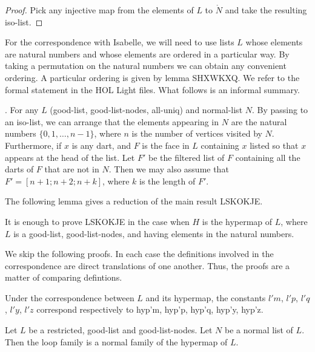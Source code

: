 \begin{proof} Pick any injective map from the elements of $L$ to $\ring{N}$ and take the resulting iso-list.
\end{proof}

For the correspondence with Isabelle, we will need to use lists $L$ whose elements are natural numbers and
whose elements are ordered in a particular way.  By taking a permutation on the natural numbers we can obtain
any convenient ordering.  A particular ordering is given by lemma SHXWKXQ.  We refer to the formal statement
in the HOL Light files.  What follows is an informal summary.

\begin{lemma}.  For any $L$ (good-list, good-list-nodes, all-uniq)
and normal-list $N$.  By passing to an iso-list, we can arrange that the elements appearing
in $N$ are the natural numbers $\{0,1,\ldots,n-1\}$, where $n$ is the number of vertices visited by $N$.
Furthermore, if $x$ is any dart, and $F$ is the face in $L$ containing $x$ listed so that $x$ appears at the head of the
list.  Let $F'$ be the filtered list of $F$ containing all the darts of $F$ that are not in $N$.  Then we may also assume that
$F' = [n+1;n+2;n+k]$, where $k$ is the length of $F'$.
\end{lemma}

The following lemma gives a reduction of the main result LSKOKJE.

\begin{lemma}[JCAJYDU]
 It is enough to prove LSKOKJE in the case when $H$ is the hypermap of $L$,
where $L$ is a good-list, good-list-nodes, and having elements in the natural numbers.
\end{lemma}




We skip the following proofs.  In each case the definitions involved in the correspondence
are direct translations of one another.  Thus, the proofs are a matter of comparing defintions.

\begin{lemma} 
Under the correspondence between $L$ and its hypermap, the constants
$l'm$, $l'p$, $l'q$, $l'y$, $l'z$ correspond respectively to hyp'm, hyp'p, hyp'q, hyp'y, hyp'z.
\end{lemma}

\begin{lemma} 
Let $L$ be a restricted, good-list and good-list-nodes.  Let $N$ be a normal list of $L$.
Then the loop family is a normal family of the hypermap of $L$.  
\end{lemma}

